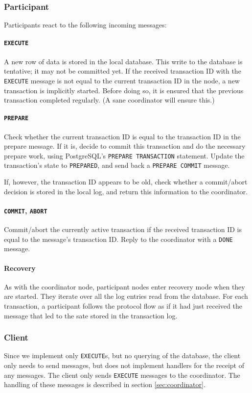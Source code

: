 \documentclass{article}
\begin{document}
\begin{multicols}{2}
\subsubsection{Participant}

Participants react to the following incoming messages:

\paragraph{\texttt{EXECUTE}} A new row of data is stored in
the local database. This write to the database is 
tentative; it may not be committed yet. If the received
transaction ID with the \texttt{EXECUTE} message is not
equal to the current transaction ID in the node, a new
transaction is implicitly started. Before doing so, it is
ensured that the previous transaction completed regularly.
(A sane coordinator will ensure this.)

\paragraph{\texttt{PREPARE}} Check whether the current
transaction ID is equal to the transaction ID in the
prepare message. If it is, decide to commit this
transaction and do the necessary prepare work, using
PostgreSQL's \texttt{PREPARE TRANSACTION} statement. 
Update the transaction's state to \texttt{PREPARED}, and
send back a \texttt{PREPARE COMMIT} message.

If, however, the transaction ID
appears to be old, check whether a
commit/abort decision is stored in the local log, and
return this information to the coordinator.

\paragraph{\texttt{COMMIT}, \texttt{ABORT}}
Commit/abort the currently active transaction if the
received transaction ID is equal to the message's
transaction ID. 
Reply to the coordinator with a \texttt{DONE}
message.

\paragraph{Recovery}

As with the coordinator node, participant nodes enter
recovery mode when they are started. They iterate over all
the log entries read from the database. For each
transaction, a participant follows the
protocol flow as if it had just received the message that
led to the sate stored in the transaction log.

\subsubsection{Client}

Since we implement only \texttt{EXECUTE}s, but no querying
of the database, the client only needs to send messages,
but does not implement handlers for the receipt of any
messages.
The client only sends \texttt{EXECUTE} messages to the
coordinator. The handling of these messages is described in
section \ref{sec:coordinator}.

\end{multicols}
\end{document}
